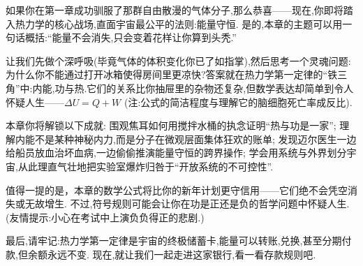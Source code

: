 \documentclass{ctexart}
\begin{document}
\pagestyle{plain}
\setcounter{footnote}{0}
\begin{center}
\end{center}\vspace{15pt}

如果你在第一章成功驯服了那群自由散漫的气体分子,那么恭喜——现在,你即将踏入热力学的核心战场,直面宇宙最公平的法则:能量守恒.%
是的,本章的主题可以用一句话概括:“能量不会消失,只会变着花样让你算到头秃.”

让我们先做个深呼吸(毕竟气体的体积变化你已了如指掌),然后思考一个灵魂问题:%
为什么你不能通过打开冰箱使得房间里更凉快?答案就在热力学第一定律的“铁三角”中:内能,功与热.它们的关系比你抽屉里的杂物还复杂,但数学表达却简单到令人怀疑人生——$\Delta U=Q+W$%
(注:公式的简洁程度与理解它的脑细胞死亡率成反比).

本章你将解锁以下成就:%
围观焦耳如何用搅拌水桶的执念证明“热与功是一家”;%
理解内能不是某种神秘内力,而是分子在微观层面集体狂欢的账单;%
发现迈尔医生一边给船员放血治坏血病,一边偷偷推演能量守恒的跨界操作;%
学会用系统与外界划分宇宙,从此理直气壮地把实验室爆炸归咎于“开放系统的不可控性”.

值得一提的是，本章的数学公式将比你的新年计划更守信用——它们绝不会凭空消失或无故增生.%
不过,符号规则可能会让你在功是正还是负的哲学问题中怀疑人生.(友情提示:小心在考试中上演负负得正的悲剧.)

最后,请牢记:热力学第一定律是宇宙的终极储蓄卡,能量可以转账,兑换,甚至分期付款,但余额永远不变.%
现在,就让我们一起走进这家银行,看一看存款规则吧.
\newpage

\newpage

\newpage

\end{document}
